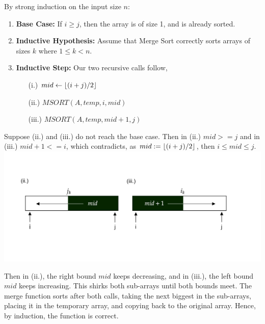 \vspace{-1.5em}
\begin{Proof}

    By strong induction on the input size $n$:
    
    \begin{enumerate}
        \item \textbf{Base Case:}  
        If $i \geq j$, then the array is of size 1, and is already sorted.
        
        \item \textbf{Inductive Hypothesis:}  
        Assume that Merge Sort correctly sorts arrays of sizes $k$ where $1\leq k < n$.
        
        \item \textbf{Inductive Step:}  
        Our two recursive calls follow, 
        \begin{enumerate}
        \item[(i.)] $mid \gets \lfloor(i + j) / 2\rfloor$
        \item[(ii.)] $MSORT(A, temp, i, mid)$
        \item[(iii.)] $MSORT(A, temp, mid + 1, j)$
        \end{enumerate}
    \end{enumerate}
    \noindent
    Suppose (ii.) and (iii.) do not reach the base case. Then in (ii.) $mid>=j$ and in (iii.) $mid+1<=i$, which contradicts, as
    $mid:=\lfloor(i+j)/2\rfloor$, then $i\leq mid \leq j$.\\

    \vspace{-4em}
    \includegraphics[width=1\textwidth]{sections/recurs/msort_proof.png}

    \vspace{-4em}
    \noindent
    Then in (ii.), the right bound $mid$ keeps decreasing, and in (iii.), the left bound $mid$ keeps increasing.
    This shirks both sub-arrays until both bounds meet. The merge function sorts after both calls, taking the next 
    biggest in the sub-arrays, placing it in the temporary array, and copying back to the original array. Hence, by induction, the function is correct.
\end{Proof}

